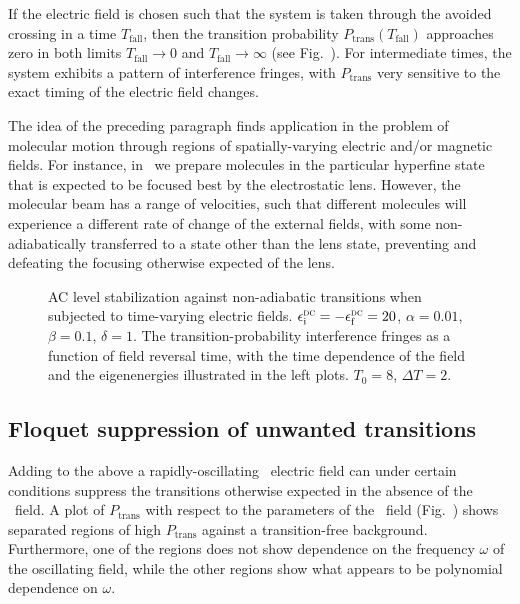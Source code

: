 If the electric field is chosen such that the system is taken through the
avoided crossing in a time $T_\text{fall}$, then the transition probability
$P_\text{trans}(T_\text{fall})$ approaches zero in both limits
$T_\text{fall}\to0$ and $T_\text{fall}\to\infty$ (see Fig.~). For
intermediate times, the system exhibits a pattern of interference fringes, with
$P_\text{trans}$ very sensitive to the exact timing of the electric field
changes.

The idea of the preceding paragraph finds application in the problem of
molecular motion through regions of spatially-varying electric and/or magnetic
fields. For instance, in \CENTREX\ we prepare molecules in the particular
hyperfine state that is expected to be focused best by the electrostatic lens.
However, the molecular beam has a range of velocities, such that different
molecules will experience a different rate of change of the external fields,
with some non-adiabatically transferred to a state other than the lens state,
preventing and defeating the focusing otherwise expected of the lens.

\begin{figure}
    \makebox[\textwidth][c]{%
        \small
        \begin{minipage}[c]{\textwidth}
            \def\svgwidth{\textwidth}
            
        \end{minipage}
    }
    \caption[AC level stabilization against non-adiabatic transitions.]{AC level
    stabilization against non-adiabatic transitions when subjected to
    time-varying electric fields.
    $\epsilon^\text{\textsc{dc}}_\text{i}=-\epsilon^\text{\textsc{dc}}_\text{f}=20$,
    $\alpha=0.01$, $\beta=0.1$, $\delta=1$. The transition-probability
    interference fringes as a function of field reversal time, with the time
    dependence of the field and the eigenenergies illustrated in the left plots.
    $T_0=8$, $\Delta T=2$.}
    \label{floquet1}
\end{figure}

\subsection{Floquet suppression of unwanted transitions}

Adding to the above a rapidly-oscillating \AC\ electric field can under certain
conditions suppress the transitions otherwise expected in the absence of the
\AC\ field. A plot of $P_\text{trans}$ with respect to the parameters of the
\AC\ field (Fig.~) shows separated regions of high
$P_\text{trans}$ against a transition-free background. Furthermore, one of the
regions does not show dependence on the frequency $\omega$ of the oscillating
field, while the other regions show what appears to be polynomial dependence on
$\omega$.

